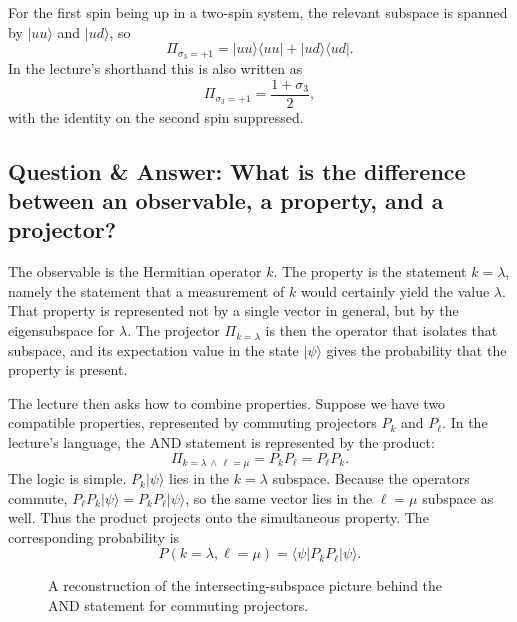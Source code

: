 For the first spin being up in a two-spin system, the relevant subspace is spanned by \(|uu\rangle\) and \(|ud\rangle\), so
\begin{equation}
\Pi_{\sigma_3=+1}=|uu\rangle\langle uu|+|ud\rangle\langle ud|.
\end{equation}
In the lecture's shorthand this is also written as
\begin{equation}
\Pi_{\sigma_3=+1}=\frac{1+\sigma_3}{2},
\end{equation}
with the identity on the second spin suppressed.

\subsection{Question \& Answer: What is the difference between an observable, a property, and a projector?}

The observable is the Hermitian operator \(k\). The property is the statement \(k=\lambda\), namely the statement that a measurement of \(k\) would certainly yield the value \(\lambda\). That property is represented not by a single vector in general, but by the eigensubspace for \(\lambda\). The projector \(\Pi_{k=\lambda}\) is then the operator that isolates that subspace, and its expectation value in the state \(|\psi\rangle\) gives the probability that the property is present.

The lecture then asks how to combine properties. Suppose we have two compatible properties, represented by commuting projectors \(P_k\) and \(P_\ell\). In the lecture's language, the AND statement is represented by the product:
\begin{equation}
\Pi_{k=\lambda\,\wedge\,\ell=\mu}=P_kP_\ell=P_\ell P_k.
\end{equation}
The logic is simple. \(P_k|\psi\rangle\) lies in the \(k=\lambda\) subspace. Because the operators commute, \(P_\ell P_k|\psi\rangle=P_kP_\ell|\psi\rangle\), so the same vector lies in the \(\ell=\mu\) subspace as well. Thus the product projects onto the simultaneous property. The corresponding probability is
\begin{equation}
P(k=\lambda,\ell=\mu)=\langle\psi|P_kP_\ell|\psi\rangle.
\end{equation}

\begin{figure}[htbp]
\centering
{}
\caption{A reconstruction of the intersecting-subspace picture behind the AND statement for commuting projectors.}
\end{figure}

